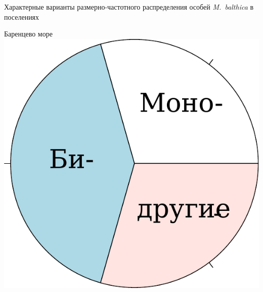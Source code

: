 \documentclass{beamer}
\begin{document}
\begin{frame}{Характерные варианты размерно-частотного распределения особей {\it M.~balthica} в поселениях}
\begin{minipage}[t]{.48\linewidth}
\begin{center}
{\footnotesize Баренцево море}\\
			\includegraphics[height=.2\textheight]{Barents_freq_types.pdf}
		\end{center}
	\end{minipage}

\hrulefill


\end{frame}
\end{document}
